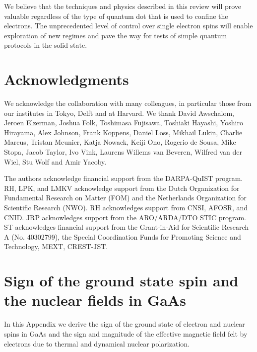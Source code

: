 \documentclass[12pt,aps,nofootinbib]{revtex4-1}
\begin{document}
We believe that the techniques and physics described in this review will 
prove valuable regardless of the type of quantum dot that is used to confine the 
electrons. The unprecedented level of control over single electron spins will 
enable exploration of new regimes and pave the way for tests of simple quantum 
protocols in the solid state.

\section*{Acknowledgments}
We acknowledge the collaboration with many colleagues, in particular those from our institutes in Tokyo, Delft and at Harvard. We thank David Awschalom, Jeroen Elzerman, Joshua Folk, Toshimasa Fujisawa, Toshiaki Hayashi, Yoshiro Hirayama, Alex Johnson, Frank Koppens, Daniel Loss, Mikhail Lukin, Charlie Marcus, Tristan Meunier, Katja Nowack, Keiji Ono, Rogerio de Sousa, Mike Stopa, Jacob Taylor, Ivo Vink, Laurens Willems van Beveren, Wilfred van der Wiel, Stu Wolf and Amir Yacoby.

The authors acknowledge financial support from the DARPA-QuIST program.
RH, LPK, and LMKV acknowledge support from the Dutch Organization for Fundamental Research on Matter (FOM) and the Netherlands Organization for Scientific Research (NWO). RH acknowledges support from CNSI, AFOSR, and CNID. JRP acknowledges support from the ARO/ARDA/DTO STIC program.
ST acknowledges financial support from the Grant-in-Aid for Scientific Research A (No. 40302799), the Special Coordination Funds for Promoting 
Science and Technology, MEXT, CREST-JST.

\appendix
\section{Sign of the ground state spin and the nuclear fields in GaAs}
\label{App:nuclearfield} In this Appendix we derive the sign of
the ground state of electron and nuclear spins in GaAs and the
sign and magnitude of the effective magnetic field felt by
electrons due to thermal and dynamical nuclear polarization.
\end{document}
